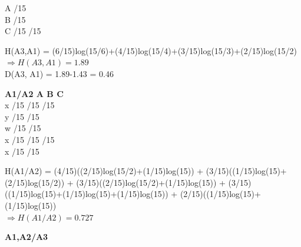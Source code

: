 \documentclass[12pt]{article}
\begin{document}
\begin{enumerate}
\begin{itemize}
\begin{center}
\quad A \qquad {}/15 \quad \quad {} \qquad \quad {} \\

\quad B \qquad \quad {} \quad \quad {}/15 \qquad {} \\

\quad C \qquad \quad {} \quad \quad {}/15 /15 \\
\end{center}
H(A3,A1) = (6/15)log(15/6)+(4/15)log(15/4)+(3/15)log(15/3)+(2/15)log(15/2) \\
$\Rightarrow H(A3,A1) = 1.89$ \\

D(A3, A1) = 1.89-1.43 = 0.46 \\
\begin{center}
	
	\textbf{A1/A2 \qquad A \qquad \quad B \qquad \quad C} \\

\quad x \qquad {}/15 \quad {}/15 \qquad {}/15 \\

\quad y \qquad \quad {} \quad \quad {}/15 \quad \quad {}/15 \\

\quad w \qquad {}/15 \quad {}/15 \qquad \quad {} \\

\quad x \qquad {}/15 \quad {}/15 \qquad {}/15 \\

\quad x \qquad {}/15 \quad \quad {} \qquad \quad {}/15 \\
\end{center}

H(A1/A2) = (4/15)((2/15)log(15/2)+(1/15)log(15)) + (3/15)((1/15)log(15)+(2/15)log(15/2)) + (3/15)((2/15)log(15/2)+(1/15)log(15)) + (3/15)((1/15)log(15)+(1/15)log(15)+(1/15)log(15)) + (2/15)((1/15)log(15)+(1/15)log(15)) \\ 

$\Rightarrow H(A1/A2) = 0.727$ \\
\newpage
\begin{center}
\textbf{A1,A2/A3 \qquad {} \quad {} \quad \quad {}} \\


\end{center}
\end{itemize}
\end{enumerate}
\end{document}
